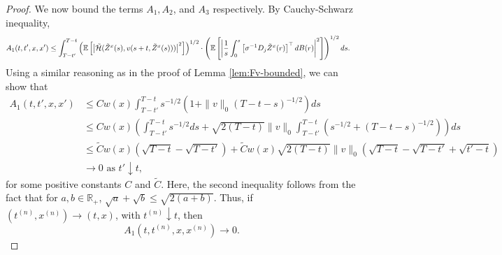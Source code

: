 \documentclass[11pt]{article}
\theoremstyle{definition}
\theoremstyle{plain}
\newcommand{\R}{\mathbb{R}}
\newcommand{\cH}{{\cal H}}
\begin{document}
\begin{appendices}
\begin{proof}
We now bound the terms \( A_1, A_2 \), and \( A_3 \) respectively. By Cauchy-Schwarz inequality,
\begin{align*}
A_1(t, t', x, x') 
&\leq \int_{T - t'}^{T - t} \left( \mathbb{E} \left[ \left|\tilde \cH(\tilde{Z}^x(s), v(s + t, \tilde{Z}^x(s)))\right|^2 \right] \right)^{1/2} 
 \cdot \left( \mathbb{E} \left[ \left| \frac{1}{s} \int_0^s \left[\sigma^{-1} D_j \tilde{Z}^x(r)\right]^{\top} dB(r) \right|^2 \right] \right)^{1/2} ds.
\end{align*}
Using a similar reasoning as in the proof of Lemma \ref{lem:Fv-bounded}, we can show that 
\begin{align*}
A_1(t, t', x, x') & \leq C w(x) \int_{T - t'}^{T - t} s^{-1/2} \left(1+\|v\|_0 (T-t-s)^{-1/2}\right) ds\\
& \leq C w(x) \left(\int_{T - t'}^{T - t} s^{-1/2} ds + \sqrt{2(T-t)} \|v\|_0 \int_{T - t'}^{T - t} \left(s^{-1/2} + (T-t-s)^{-1/2}\right)\right) ds \\
& \leq \tilde C w(x) \left(\sqrt{T-t} - \sqrt{T-t'}\right) +\tilde C w(x) \sqrt{2(T-t)} \|v\|_0 \left(\sqrt{T-t} - \sqrt{T-t'} + \sqrt{t'-t}\right) \\
& \to 0 \text{ as } t' \downarrow t,
\end{align*}
for some positive constants $C$ and $\tilde C$. Here, the second inequality follows from the fact that for $a, b \in \R_+$, 
$\sqrt{a} + \sqrt{b} \leq \sqrt{2(a+b)}$.
Thus, if \( (t^{(n)}, x^{(n)}) \to (t, x) \),  
with \( t^{(n)} \downarrow t \), then  
\[
A_1(t, t^{(n)}, x, x^{(n)}) \to 0.
\]


\end{proof}
\end{appendices}
\end{document}
